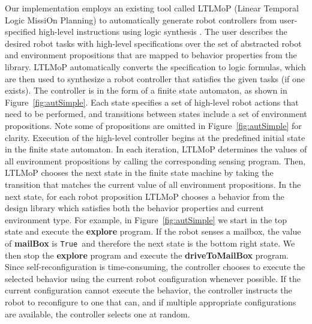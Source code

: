 \documentclass[12pt]{article}
\newcommand{\lt}{{\tt True }}
\begin{document}
Our implementation employs an existing tool called LTLMoP (Linear Temporal Logic MissiOn Planning) to automatically generate robot controllers from user-specified high-level instructions using logic synthesis \cite{DBLP:conf/iros/FinucaneJK10,DBLP:journals/trob/Kress-GazitFP09}.
The user describes the desired robot tasks with high-level specifications over the set of abstracted robot and environment propositions that are mapped to behavior properties from the library.
LTLMoP automatically converts the specification to logic formulas, which are then used to synthesize a robot controller that satisfies the given tasks (if one exists).
The controller is in the form of a finite state automaton, as shown in Figure~\ref{fig:autSimple}.
Each state specifies a set of high-level robot actions that need to be performed, and transitions between states include a set of environment propositions.
Note some of propositions are omitted in Figure~\ref{fig:autSimple} for clarity.
Execution of the high-level controller begins at the predefined initial state in the finite state automaton. In each iteration, LTLMoP determines the values of all environment propositions by calling the corresponding sensing program. Then, LTLMoP chooses the next state in the finite state machine by taking the transition that matches the current value of all environment propositions. 
In the next state, for each robot proposition LTLMoP chooses a behavior from the design library which satisfies both the behavior properties and current environment type.
For example, in Figure~\ref{fig:autSimple} we start in the top state and execute the \textbf{explore} program.
If  the robot senses a mailbox, the value of \textbf{mailBox} is \lt and therefore the next state is the bottom right state. We then stop the \textbf{explore} program and execute the \textbf{driveToMailBox} program.
Since self-reconfiguration is time-consuming, the controller chooses to execute the selected behavior using the current robot configuration whenever possible.
If the current configuration cannot execute the behavior, the controller instructs the robot to reconfigure to one that can, and if multiple appropriate configurations are available, the controller selects one at random.

\end{document}
